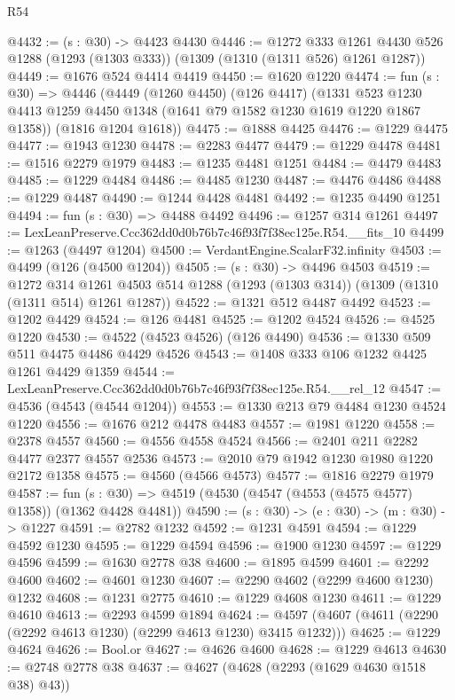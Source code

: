 \begin{lexlean}{R54}
\begin{coremodule}
@4432 := (s : @30) -> @4423 @4430
@4446 := @1272
    @333
    @1261
    @4430
    @526
    @1288
    (@1293 (@1303 @333))
    (@1309 (@1310 (@1311 @526) @1261 @1287))
@4449 := @1676 @524 @4414 @4419
@4450 := @1620 @1220
@4474 := fun (s : @30) =>
  @4446
    (@4449
      (@1260 @4450)
      (@126 @4417)
      (@1331 @523 @1230 @4413 @1259 @4450 @1348 (@1641 @79 @1582 @1230 @1619 @1220 @1867 @1358))
      (@1816 @1204 @1618))
@4475 := @1888 @4425
@4476 := @1229 @4475
@4477 := @1943 @1230
@4478 := @2283 @4477
@4479 := @1229 @4478
@4481 := @1516 @2279 @1979
@4483 := @1235 @4481 @1251
@4484 := @4479 @4483
@4485 := @1229 @4484
@4486 := @4485 @1230
@4487 := @4476 @4486
@4488 := @1229 @4487
@4490 := @1244 @4428 @4481
@4492 := @1235 @4490 @1251
@4494 := fun (s : @30) => @4488 @4492
@4496 := @1257 @314 @1261
@4497 := LexLeanPreserve.Ccc362dd0d0b76b7c46f93f7f38ec125e.R54.__fits_10
@4499 := @1263 (@4497 @1204)
@4500 := VerdantEngine.ScalarF32.infinity
@4503 := @4499 (@126 (@4500 @1204))
@4505 := (s : @30) -> @4496 @4503
@4519 := @1272
    @314
    @1261
    @4503
    @514
    @1288
    (@1293 (@1303 @314))
    (@1309 (@1310 (@1311 @514) @1261 @1287))
@4522 := @1321 @512 @4487 @4492
@4523 := @1202 @4429
@4524 := @126 @4481
@4525 := @1202 @4524
@4526 := @4525 @1220
@4530 := @4522 (@4523 @4526) (@126 @4490)
@4536 := @1330 @509 @511 @4475 @4486 @4429 @4526
@4543 := @1408 @333 @106 @1232 @4425 @1261 @4429 @1359
@4544 := LexLeanPreserve.Ccc362dd0d0b76b7c46f93f7f38ec125e.R54.__rel_12
@4547 := @4536 (@4543 (@4544 @1204))
@4553 := @1330 @213 @79 @4484 @1230 @4524 @1220
@4556 := @1676 @212 @4478 @4483
@4557 := @1981 @1220
@4558 := @2378 @4557
@4560 := @4556 @4558 @4524
@4566 := @2401 @211 @2282 @4477 @2377 @4557 @2536
@4573 := @2010 @79 @1942 @1230 @1980 @1220 @2172 @1358
@4575 := @4560 (@4566 @4573)
@4577 := @1816 @2279 @1979
@4587 := fun (s : @30) => @4519 (@4530 (@4547 (@4553 (@4575 @4577) @1358)) (@1362 @4428 @4481))
@4590 := (s : @30) -> (e : @30) -> (m : @30) -> @1227
@4591 := @2782 @1232
@4592 := @1231 @4591
@4594 := @1229 @4592 @1230
@4595 := @1229 @4594
@4596 := @1900 @1230
@4597 := @1229 @4596
@4599 := @1630 @2778 @38
@4600 := @1895 @4599
@4601 := @2292 @4600
@4602 := @4601 @1230
@4607 := @2290 @4602 (@2299 @4600 @1230) @1232
@4608 := @1231 @2775
@4610 := @1229 @4608 @1230
@4611 := @1229 @4610
@4613 := @2293 @4599 @1894
@4624 := @4597 (@4607 (@4611 (@2290 (@2292 @4613 @1230) (@2299 @4613 @1230) @3415 @1232)))
@4625 := @1229 @4624
@4626 := Bool.or
@4627 := @4626 @4600
@4628 := @1229 @4613
@4630 := @2748 @2778 @38
@4637 := @4627 (@4628 (@2293 (@1629 @4630 @1518 @38) @43))

\end{coremodule}
\end{lexlean}
